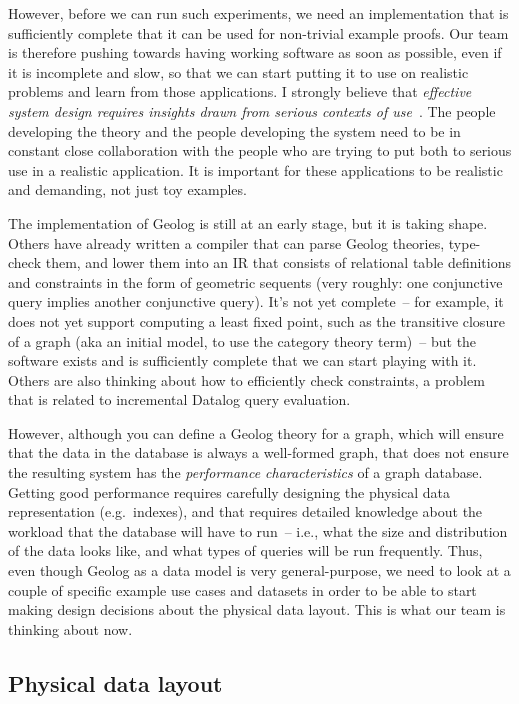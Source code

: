 \documentclass{article}
\begin{document}
However, before we can run such experiments, we need an implementation that is sufficiently complete that it can be used for non-trivial example proofs.
Our team is therefore pushing towards having working software as soon as possible, even if it is incomplete and slow, so that we can start putting it to use on realistic problems and learn from those applications.
I strongly believe that \emph{effective system design requires insights drawn from serious contexts of use}~\citep{matuschak-2023}.
The people developing the theory and the people developing the system need to be in constant close collaboration with the people who are trying to put both to serious use in a realistic application.
It is important for these applications to be realistic and demanding, not just toy examples.

The implementation of Geolog is still at an early stage, but it is taking shape.
Others have already written a compiler that can parse Geolog theories, type-check them, and lower them into an IR that consists of relational table definitions and constraints in the form of geometric sequents (very roughly: one conjunctive query implies another conjunctive query).
It's not yet complete~-- for example, it does not yet support computing a least fixed point, such as the transitive closure of a graph (aka an initial model, to use the category theory term)~-- but the software exists and is sufficiently complete that we can start playing with it.
Others are also thinking about how to efficiently check constraints, a problem that is related to incremental Datalog query evaluation.

However, although you can define a Geolog theory for a graph, which will ensure that the data in the database is always a well-formed graph, that does not ensure the resulting system has the \emph{performance characteristics} of a graph database.
Getting good performance requires carefully designing the physical data representation (e.g.\ indexes), and that requires detailed knowledge about the workload that the database will have to run~-- i.e., what the size and distribution of the data looks like, and what types of queries will be run frequently.
Thus, even though Geolog as a data model is very general-purpose, we need to look at a couple of specific example use cases and datasets in order to be able to start making design decisions about the physical data layout.
This is what our team is thinking about now.

\subsection{Physical data layout}
\end{document}
